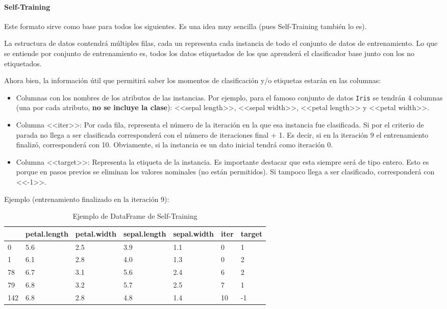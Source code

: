 \paragraph{Self-Training}
Este formato sirve como base para todos los siguientes. Es una idea muy sencilla
(pues Self-Training también lo es). 

La estructura de datos contendrá múltiples filas, cada un representa cada
instancia de todo el conjunto de datos de entrenamiento. Lo que se entiende por
conjunto de entrenamiento es, todos los datos etiquetados de los que aprenderá
el clasificador base junto con los no etiquetados.

Ahora bien, la información útil que permitirá saber los momentos de
clasificación y/o etiquetas estarán en las columnas:

\begin{itemize}
    \item Columnas con los nombres de los atributos de las instancias. Por
    ejemplo, para el famoso conjunto de datos \texttt{Iris} se tendrán 4
    columnas (una por cada atributo, \textbf{no se incluye la clase}): <<sepal
    length>>, <<sepal width>>, <<petal length>> y <<petal width>>.
    \item Columna <<iter>>: Por cada fila, representa el número de la iteración
    en la que esa instancia fue clasificada. Si por el criterio de parada no
    llega a ser clasificada corresponderá con el número de iteraciones final +
    1. Es decir, si en la iteración 9 el entrenamiento finalizó, corresponderá
    con 10. Obviamente, si la instancia es un dato inicial tendrá como iteración
    0.
    \item Columna <<target>>: Representa la etiqueta de la instancia. Es
    importante destacar que esta siempre será de tipo entero. Esto es porque en
    pasos previos se eliminan los valores nominales (no están permitidos). Si
    tampoco llega a ser clasificado, corresponderá con <<-1>>.
\end{itemize}

Ejemplo (entrenamiento finalizado en la iteración 9):
\begin{table}[H]
\begin{tabular}{lllllll}
    & petal.length & petal.width & sepal.length & sepal.width & iter & target \\ \hline
0   & 5.6          & 2.5         & 3.9          & 1.1         & 0    & 1      \\
1   & 6.1          & 2.8         & 4.0          & 1.3         & 0    & 2      \\
78  & 6.7          & 3.1         & 5.6          & 2.4         & 6    & 2      \\
79  & 6.8          & 3.2         & 5.7          & 2.5         & 7    & 1      \\
142 & 6.8          & 2.8         & 4.8          & 1.4         & 10   & -1    
\end{tabular}
\caption{Ejemplo de DataFrame de Self-Training}
\end{table}

